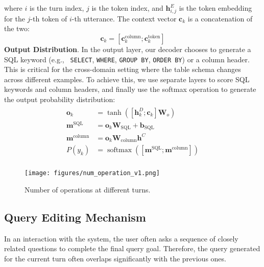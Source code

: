 \documentclass[11pt,a4paper]{article}
\newcommand{\newvec}[1]{\mathbf{#1}}
\DeclareMathOperator*{\softmax}{softmax}
\begin{document}
where $i$ is the turn index, $j$ is the token index, and $\newvec{h}^{E}_{i,j}$ is the token embedding for the $j$-th token of $i$-th utterance.
The context vector $\newvec{c}_k$ is a concatenation of the two:
\begin{equation*}
  \newvec{c}_k = [\newvec{c}_k^{\text{column}};\newvec{c}_k^{\text{token}}]  
\end{equation*}
\textbf{Output Distribution}. In the output layer, our decoder chooses to generate a SQL keyword (e.g., \texttt{
SELECT}, \texttt{WHERE}, \texttt{GROUP BY}, \texttt{ORDER BY}) or a column header.
This is critical for the cross-domain setting where the table schema changes across different examples.
To achieve this, we use separate layers to score SQL keywords and column headers, and finally use the softmax operation to generate the output probability distribution:
\begin{align}
\label{eq:output}
\begin{split}
\newvec{o}_{k}             & = \tanh([\newvec{h}^{D}_{k};\newvec{c}_k]\newvec{W}_{o}) \\
\newvec{m}^{\text{SQL}}    & = \newvec{o}_{k}\newvec{W}_{\text{SQL}} + \newvec{b}_{\text{SQL}} \\
\newvec{m}^{\text{column}} & = \newvec{o}_{k}\newvec{W}_{\text{column}}\newvec{h}^{C} \\
P(y_k)                     & = \softmax([\newvec{m}^{\text{SQL}}; \newvec{m}^{\text{column}}]) \\
\end{split}
\end{align}

\begin{figure}[t!]
  \centering
  \texttt{[image: figures/num\_operation\_v1.png]}
  \caption{Number of operations at different turns.}
  \vspace{-4mm}
  \label{fig:num_operation}
\end{figure}

\vspace{-2mm}
\subsection{Query Editing Mechanism}
\label{sec:query_edit}
In an interaction with the system, the user often asks a sequence of closely related questions to complete the final query goal.
Therefore, the query generated for the current turn often overlaps significantly with the previous ones.
\end{document}
